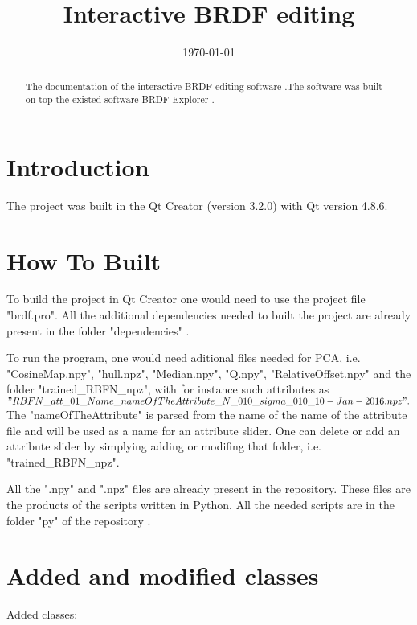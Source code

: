 \documentclass{article}
\title{Interactive BRDF editing}
\date{\today}
\begin{document}
\maketitle


\begin{abstract}
The documentation of  the interactive BRDF editing software \cite{git}.The software was built on top the existed software BRDF Explorer \cite{brdfExplorer}.
\end{abstract}


\section{Introduction}
The project was built in the Qt Creator (version 3.2.0) \cite{qtCreator} with Qt version 4.8.6. \cite{qtVer}
\section{How To Built} \label{built}
To build the project in Qt Creator one would need to use the project file "brdf.pro". All the additional dependencies needed to built the project are already present in the folder "dependencies" \cite{git}.

\begin{flushleft} 

To run the program, one would need aditional files needed for PCA, i.e. "CosineMap.npy", "hull.npz", "Median.npy", "Q.npy",  "RelativeOffset.npy" and the folder "trained\_RBFN\_npz", with for instance such attributes as $"RBFN\_att\_01\_Name\_nameOfTheAttribute\_N\_010\_sigma\_010\_10-Jan-2016.npz".$
The "nameOfTheAttribute" is parsed from the name of the name of the attribute file and will be used as a name for an attribute slider. One can delete or add an attribute slider by simplying adding or modifing that folder, i.e. "trained\_RBFN\_npz".
\end{flushleft}

\begin{flushleft} 
All the ".npy" and ".npz" files are already present in the repository. These files are the products of the scripts written in Python. All the needed scripts are in the folder "py" of the repository \cite{git}.
\end{flushleft}



\section{Added and modified classes} \label{documentclasses}
Added classes:
\end{document}
